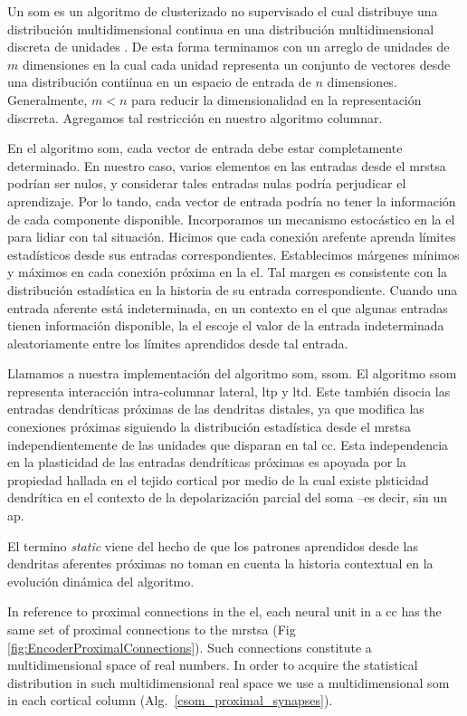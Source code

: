 {Un \gls{som} es un algoritmo de clusterizado no supervisado el cual distribuye una distribución multidimensional continua
en una distribución multidimensional discreta de unidades \cite{Kohonen:1989:SAM:69371, kohonen_2082}.
De esta forma terminamos con un arreglo de unidades de $m$ dimensiones en la cual cada unidad
representa un conjunto de vectores desde una distribución contiínua en un espacio de entrada de $n$ dimensiones.
Generalmente, $m < n$ para reducir la dimensionalidad en la representación discrreta.
Agregamos tal restricción en nuestro algoritmo columnar.

En el algoritmo \gls{som}, cada vector de entrada debe estar completamente determinado.
En nuestro caso, varios elementos en las entradas desde el \gls{mrstsa} podrían ser nulos,
y considerar tales entradas nulas podría perjudicar el aprendizaje.
Por lo tando, cada vector de entrada podría no tener la información de cada componente disponible.
Incorporamos un mecanismo estocástico en la \gls{el} para lidiar con tal situación.
Hicimos que cada conexión arefente aprenda límites estadísticos desde sus entradas correspondientes.
Establecimos márgenes mínimos y máximos en cada conexión próxima en la \gls{el}.
Tal margen es consistente con la distribución estadística en la historia de su entrada correspondiente.
Cuando una entrada aferente está indeterminada, en un contexto en el que algunas entradas tienen información disponible,
la \gls{el} escoje el valor de la entrada indeterminada aleatoriamente
entre los límites aprendidos desde tal entrada.

Llamamos a nuestra implementación del algoritmo \gls{som}, \gls{ssom}.
El algoritmo \gls{ssom} representa interacción intra-columnar lateral, \gls{ltp} y \gls{ltd}.
Este también disocia las entradas dendríticas próximas de las dendritas distales, ya que
modifica  las conexiones próximas siguiendo la distribución estadística desde el \gls{mrstsa}
independientemente de las unidades que disparan en tal \gls{cc}.
Esta independencia en la plasticidad de las entradas dendríticas próximas es apoyada por la propiedad
hallada en el tejido cortical por medio de la cual existe plsticidad dendrítica
en el contexto de la depolarización parcial del soma \cite{reiter_1998}--es decir, sin un \gls{ap}.

El termino \textit{static} viene del hecho de que los patrones aprendidos desde las dendritas aferentes próximas
no toman en cuenta la historia contextual en la evolución dinámica del algoritmo.
}{
In reference to proximal connections in the \gls{el}, each neural unit in a \gls{cc} has the same set of
proximal connections to the \gls{mrstsa} (Fig \ref{fig:EncoderProximalConnections}).
Such connections constitute a multidimensional space of real numbers.
In order to acquire the statistical distribution in such multidimensional real space we use
a multidimensional \gls{som} in each cortical column (Alg.~\ref{csom_proximal_synapses}).

}
